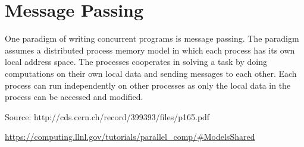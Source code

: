 \section{Message Passing}

One paradigm of writing concurrent programs is message passing. The paradigm assumes a distributed process memory model in which each process has its own local address space. The processes cooperates in solving a task by doing computations on their own local data and sending messages to each other. Each process can run independently on other processes as only the local data in the process can be accessed and modified.

Source: http://cds.cern.ch/record/399393/files/p165.pdf

\url{https://computing.llnl.gov/tutorials/parallel_comp/#ModelsShared}
